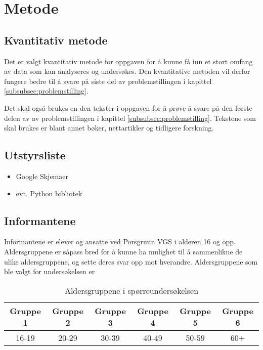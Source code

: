 \section{Metode}

\subsection{Kvantitativ metode}
Det er valgt kvantitativ metode for oppgaven for å kunne få inn et stort omfang av data som kan analyseres og undersøkes. Den kvantitative metoden vil derfor fungere bedre til å svare på siste del av problemstillingen i kapittel \ref{subsubsec:problemstilling}.

Det skal også brukes en den tekster i oppgaven for å prøve å svare på den første delen av av problemstillingen i kapittel \ref{subsubsec:problemstilling}. Tekstene som skal brukes er blant annet bøker, nettartikler og tidligere forskning.

\subsection{Utstyrsliste}
\begin{itemize}
    \item Google Skjemaer
    \item evt. Python bibliotek
\end{itemize}

\subsection{Informantene}
Informantene er elever og ansatte ved Porsgrunn VGS i alderen 16 og opp. Aldersgruppene er såpass bred for å kunne ha mulighet til å sammenlikne de ulike aldersgruppene, og sette deres svar opp mot hverandre. Aldersgruppene som ble valgt for undersøkelsen er

\begin{table}[h]
    \begin{center}
        \begin{tabular}{|c|c|c|c|c|c|}
            \hline
            Gruppe 1 & Gruppe 2 & Gruppe 3 & Gruppe 4 & Gruppe 5 & Gruppe 6 \\
            \hline
            16-19 & 20-29 & 30-39 & 40-49 & 50-59 & 60+ \\
            \hline
        \end{tabular}
        \caption{Aldersgruppene i spørreundersøkelsen}
    \end{center}
\end{table}

